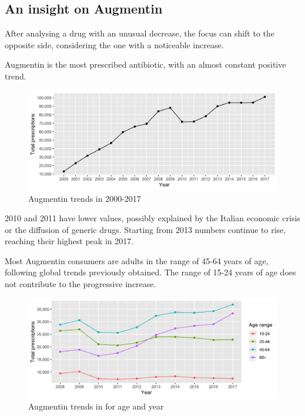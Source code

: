 \subsection{An insight on Augmentin}
After analysing a drug with an unusual decrease, the focus can shift to the opposite side, considering the one with a noticeable increase.

Augmentin is the most prescribed antibiotic, with an almost constant positive trend.

\begin{figure}[h]
	\centering
	\includegraphics[scale=0.3]{../plots/augmentin-year.png}
	\caption{\small Augmentin trends in 2000-2017}
\end{figure}

2010 and 2011 have lower values, possibly explained by the Italian economic crisis or the diffusion of generic drugs. Starting from 2013 numbers continue to rise, reaching their highest peak in 2017.

Most Augmentin consumers are adults in the range of 45-64 years of age, following global trends previously obtained. The range of 15-24 years of age does not contribute to the progressive increase.

\begin{figure}[h]
	\centering
	\includegraphics[scale=0.3]{../plots/augmentin_age-year.png}
	\caption{\small Augmentin trends in for age and year}
\end{figure}

